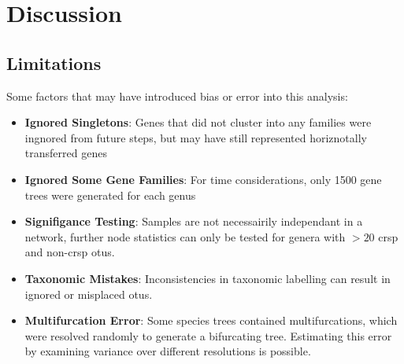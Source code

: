 \section{Discussion}
\subsection{Limitations}
Some factors that may have introduced bias or error into this analysis:
\begin{itemize}
        \item \textbf{Ignored Singletons}: Genes that did not cluster into any families were ingnored from future steps, but may have still represented horiznotally transferred genes
        \item \textbf{Ignored Some Gene Families}: For time considerations, only 1500 gene trees were generated for each genus
        \item \textbf{Signifigance Testing}: Samples are not necessairily independant in a network, further node statistics can only be tested for genera with $> 20$ \ac{crsp} and non-\ac{crsp} \ac{otu}s.
        \item \textbf{Taxonomic Mistakes}: Inconsistencies in taxonomic labelling can result in ignored or misplaced \ac{otu}s.
        \item \textbf{Multifurcation Error}: Some species trees contained multifurcations, which were resolved randomly to generate a bifurcating tree. Estimating this error by examining variance over different resolutions is possible.
\end{itemize}
